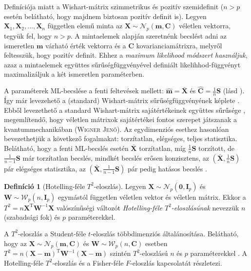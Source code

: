 \documentclass[DIV=15,appendixprefix]{scrreprt}
\theoremstyle{definition}
\newtheorem*{defin}{Definíció}
\theoremstyle{remark}
\newcommand{\normald}{\mathcal{N}}
\newcommand{\wishartd}{\mathcal{W}}
\DeclareMathOperator{\T}{T}
\begin{document}
Definíciója miatt a Wishart-mátrix szimmetrikus és pozitív szemidefinit ($ n > p $ esetén belátható,
hogy majdnem biztosan pozitív definit is).
%
Legyen $ \mathbf{ X }_{ 1 },{} \mathbf{ X }_{ 2 },{} \ldots,{} \mathbf{ X }_{ n } $ független elemű
minta az $ \mathbf{ X } \sim \normald_{ p } \left( \mathbf{ m },{} \mathbf{ C } \right) $ véletlen
vektorra, tegyük fel, hogy $ n > p $. A mintaelemek alapján szeretnénk becslést adni az ismeretlen
$ \mathbf{ m } $ várható érték vektorra és a $ \mathbf{ C } $ kovarianciamátrixra, melyről
feltesszük, hogy pozitív definit. Ehhez a \emph{maximum likelihood módszert használjuk}, azaz a
mintaelemek együttes sűrűségfüggvényével definiált likelihhod-függvényt maximalizáljuk a két
ismeretlen paraméterben.

A paraméterek ML-becslése a fenti feltevések mellett: $ \hat{ \mathbf{ m } } =
\bar{ \mathbf{ X } } $ és $ \hat{ \mathbf{ C } } = \frac{ 1 }{ n } \mathbf{ S } $ (lásd
\cite[5.~fejezet, 5.~szakasz, 5.1.~tétel]{BollaKramli}). Így már levezehető a (standard)
Wishart-mátrix sűrűségfüggvényének képlete \cite[5.~fejezet, 5.~szakasz, 5.2. és
5.3.~tétel]{BollaKramli}. Ebből levezethető a standard Wishart-mátrix sajátértékeinek együttes
sűrűsége \cite[5.~fejezet, 5.~szakasz, 5.4.~tétel]{BollaKramli}, megemlítendő, hogy véletlen
mátrixok sajátértékei fontos szerepet játszanak a kvantummechanikában (\textsc{Wigner Jenő}).
%
Az egydimenziós esethez hasonlóan bevezethetjük a következő fogalmakat: torzítatlan, elégséges,
teljes statisztika. Belátható, hogy a fenti ML-becslés esetén $ \bar{ \mathbf{ X } } $ torzítatlan,
míg $ \frac{ 1 }{ n } \mathbf{ S } $ torzított, de $ \frac{ 1 }{ n - 1 } \mathbf{ S } $ már
torzítatlan becslés, mindkét becslés erősen konzisztens, az $ \left(  \bar{ \mathbf{ X } },{}
\frac{ 1 }{ n } \mathbf{ S } \right) $ pár elégséges statisztika, az $ \left(
\bar{ \mathbf{ X } },{} \frac{ 1 }{ n - 1 } \mathbf{ S } \right) $ pár pedig hatásos becslés
\cite[5. fejezet, 6. szakasz eleje]{BollaKramli}.
\begin{defin}[Hotelling-féle $ T^{ 2 } $-eloszlás]
	Legyen $ \mathbf{ X } \sim \normald_{ p } \left( \mathbf{ 0 },{} \mathbf{ I }_{ p } \right) $ és
	$ \mathbf{ W } \sim \wishartd_{ p } \left( n,{} \mathbf{ I }_{ p } \right) $ egymástól független
	véletlen vektor és véletlen mátrix. Ekkor a $ T^{ 2 } = n \mathbf{ X }^{ \T }
	\mathbf{ W }^{ - 1 } \mathbf{ X } $ valószínűségi változót \emph{Hotelling-féle
	$ T^{ 2 }$-eloszlásúnak} nevezzük $ n $ (szabadsági fok) és $ p $ paraméterekkel.
\end{defin}
A $ T^{ 2 } $-eloszlás a Student-féle $ t $-eloszlás többdimenziós általánosítása. Belátható, hogy
az $ \mathbf{ X } \sim \normald_{ p } \left( \mathbf{ m },{} \mathbf{ C } \right) $ és
$ \mathbf{ W } \sim \wishartd_{ p } \left( n,{} \mathbf{ C } \right) $ esetben $ T^{ 2 } = n \left(
\mathbf{ X } - \mathbf{ m } \right)^{ \T } \mathbf{ W }^{ - 1 } \left( \mathbf{ X } - \mathbf{ m }
\right) $ szintén $ T^{ 2 } $-eloszlású $ n $ és $ p $ paraméterekkel \cite[5.~fejezet, 6.~szakasz,
6.1.~állítás]{BollaKramli}. A Hotelling-féle $ T^{ 2 } $-eloszlás és a Fisher-féle $ F $-eloszlás
kapcsolatát \cite[5.~fejezet, 6.~szakasz, 6.2.~tétel]{BollaKramli} részletezi.
\end{document}
